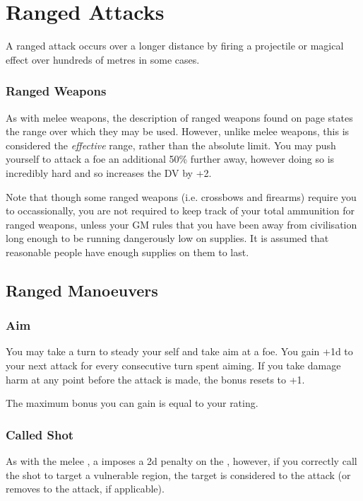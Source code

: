\section{Ranged Attacks}

A ranged attack occurs over a longer distance by firing a projectile or magical effect over hundreds of metres in some cases. 

\subsubsection{Ranged Weapons}

As with melee weapons, the description of ranged weapons found on page \pageref{S:Weapons} states the range over which they may be used. However, unlike melee weapons, this is considered the {\it effective} range, rather than the absolute limit. You may push yourself to attack a foe an additional 50\% further away, however doing so is incredibly hard and so increases the DV by +2. 

Note that though some ranged weapons (i.e. crossbows and firearms) require you to  occassionally, you are not required to keep track of your total ammunition for ranged weapons, unless your GM rules that you have been away from civilisation long enough to be running dangerously low on supplies. It is assumed that reasonable people have enough supplies on them to last. 

\subsection{Ranged Manoeuvers}

\subsubsection{Aim}

You may take a turn to steady your self and take aim at a foe. You gain +1d to your next attack for every consecutive turn spent aiming. If you take damage harm at any point before the attack is made, the bonus resets to +1. 

The maximum bonus you can gain is equal to your  rating. 

\subsubsection{Called Shot}

As with the melee , a  imposes a 2d penalty on the , however, if you correctly call the shot to target a vulnerable region, the target is considered  to the attack (or removes  to the attack, if applicable).


